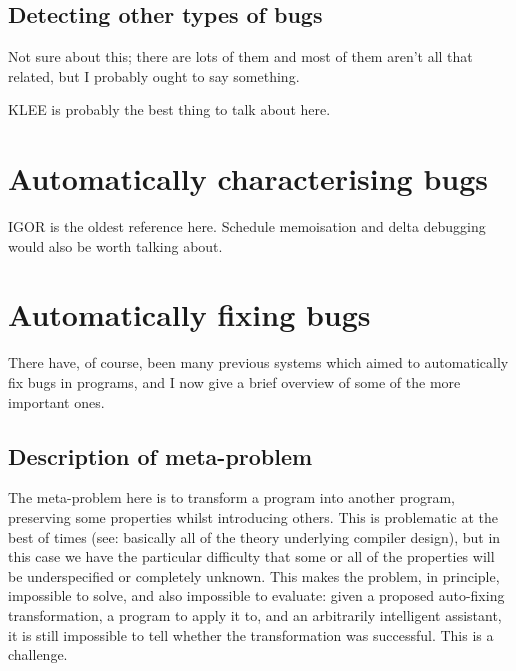 \subsection{Detecting other types of bugs}

Not sure about this; there are lots of them and most of them aren't
all that related, but I probably ought to say something.

KLEE is probably the best thing to talk about here.

\section{Automatically characterising bugs}

IGOR is the oldest reference here.  Schedule memoisation and delta
debugging would also be worth talking about.  

\section{Automatically fixing bugs}

There have, of course, been many previous systems which aimed to
automatically fix bugs in programs, and I now give a brief overview of
some of the more important ones.

\subsection{Description of meta-problem}

The meta-problem here is to transform a program into another program,
preserving some properties whilst introducing others.  This is
problematic at the best of times (see: basically all of the theory
underlying compiler design), but in this case we have the particular
difficulty that some or all of the properties will be underspecified
or completely unknown.  This makes the problem, in principle,
impossible to solve, and also impossible to evaluate: given a proposed
auto-fixing transformation, a program to apply it to, and an
arbitrarily intelligent assistant, it is still impossible to tell
whether the transformation was successful.  This is a
challenge.


